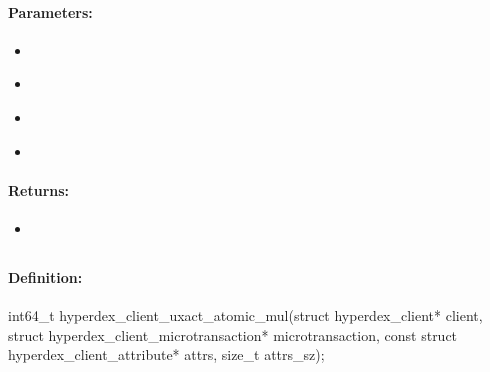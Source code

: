 \paragraph{Parameters:}
\begin{itemize}[noitemsep]
\item {}\\

\item {}\\

\item {}\\

\item {}\\

\end{itemize}

\paragraph{Returns:}
\begin{itemize}[noitemsep]
\item {}\\

\end{itemize}

\pagebreak
\subsection{}
\label{api:c:uxact_atomic_mul}


\paragraph{Definition:}
\begin{ccode}
int64_t hyperdex_client_uxact_atomic_mul(struct hyperdex_client* client,
        struct hyperdex_client_microtransaction* microtransaction,
        const struct hyperdex_client_attribute* attrs, size_t attrs_sz);
\end{ccode}


